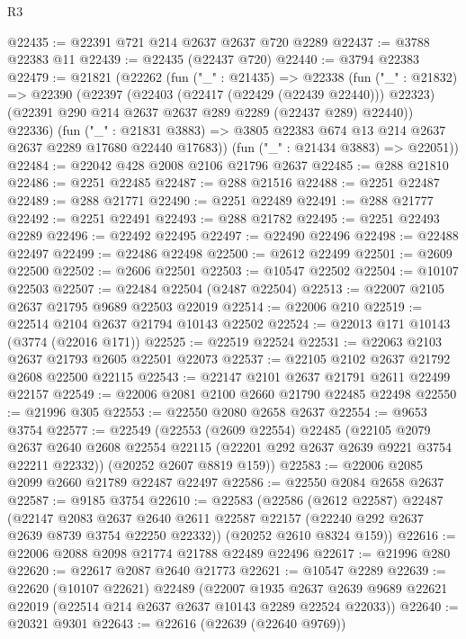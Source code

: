 \begin{lexlean}{R3}
\begin{coremodule}
@22435 := @22391 @721 @214 @2637 @2637 @720 @2289
@22437 := @3788 @22383 @11
@22439 := @22435 (@22437 @720)
@22440 := @3794 @22383
@22479 := @21821
    (@22262
      (fun ("_" : @21435) =>
      @22338
        (fun ("_" : @21832) =>
        @22390
          (@22397
            (@22403 (@22417 (@22429 (@22439 @22440))) @22323)
            (@22391 @290 @214 @2637 @2637 @289 @2289 (@22437 @289) @22440))
          @22336)
        (fun ("_" : @21831 @3883) =>
        @3805 @22383 @674 @13 @214 @2637 @2637 @2289 @17680 @22440 @17683))
      (fun ("_" : @21434 @3883) => @22051))
@22484 := @22042 @428 @2008 @2106 @21796 @2637
@22485 := @288 @21810
@22486 := @2251 @22485
@22487 := @288 @21516
@22488 := @2251 @22487
@22489 := @288 @21771
@22490 := @2251 @22489
@22491 := @288 @21777
@22492 := @2251 @22491
@22493 := @288 @21782
@22495 := @2251 @22493 @2289
@22496 := @22492 @22495
@22497 := @22490 @22496
@22498 := @22488 @22497
@22499 := @22486 @22498
@22500 := @2612 @22499
@22501 := @2609 @22500
@22502 := @2606 @22501
@22503 := @10547 @22502
@22504 := @10107 @22503
@22507 := @22484 @22504 (@2487 @22504)
@22513 := @22007 @2105 @2637 @21795 @9689 @22503 @22019
@22514 := @22006 @210
@22519 := @22514 @2104 @2637 @21794 @10143 @22502
@22524 := @22013 @171 @10143 (@3774 (@22016 @171))
@22525 := @22519 @22524
@22531 := @22063 @2103 @2637 @21793 @2605 @22501 @22073
@22537 := @22105 @2102 @2637 @21792 @2608 @22500 @22115
@22543 := @22147 @2101 @2637 @21791 @2611 @22499 @22157
@22549 := @22006 @2081 @2100 @2660 @21790 @22485 @22498
@22550 := @21996 @305
@22553 := @22550 @2080 @2658 @2637
@22554 := @9653 @3754
@22577 := @22549
    (@22553
      (@2609 @22554)
      @22485
      (@22105
        @2079
        @2637
        @2640
        @2608
        @22554
        @22115
        (@22201 @292 @2637 @2639 @9221 @3754 @22211 @22332))
      (@20252 @2607 @8819 @159))
@22583 := @22006 @2085 @2099 @2660 @21789 @22487 @22497
@22586 := @22550 @2084 @2658 @2637
@22587 := @9185 @3754
@22610 := @22583
    (@22586
      (@2612 @22587)
      @22487
      (@22147
        @2083
        @2637
        @2640
        @2611
        @22587
        @22157
        (@22240 @292 @2637 @2639 @8739 @3754 @22250 @22332))
      (@20252 @2610 @8324 @159))
@22616 := @22006 @2088 @2098 @21774 @21788 @22489 @22496
@22617 := @21996 @280
@22620 := @22617 @2087 @2640 @21773
@22621 := @10547 @2289
@22639 := @22620
    (@10107 @22621)
    @22489
    (@22007
      @1935
      @2637
      @2639
      @9689
      @22621
      @22019
      (@22514 @214 @2637 @2637 @10143 @2289 @22524 @22033))
@22640 := @20321 @9301
@22643 := @22616 (@22639 (@22640 @9769))

\end{coremodule}
\end{lexlean}
